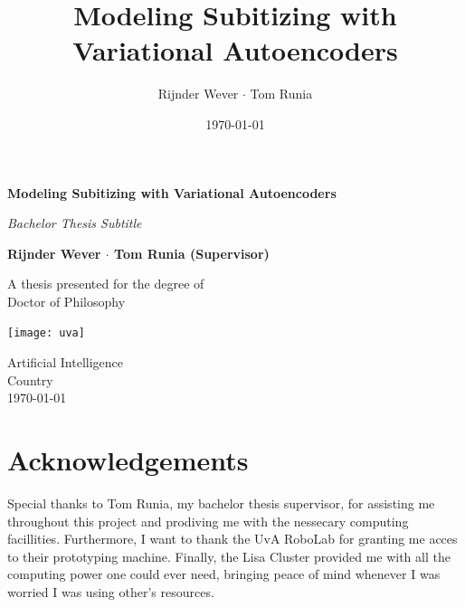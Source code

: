 \documentclass[twocolumn]{article}
\title{Modeling Subitizing with Variational Autoencoders}
\author{Rijnder Wever \(\cdot\) Tom Runia}
\affil{University of Amsterdam} %
\date{\today}
\begin{document}
\begin{titlepage}
    \begin{center}
        \vspace*{\fill} %
        \Huge
        \textbf{Modeling Subitizing with Variational Autoencoders}
        
        \vspace{0.5cm}
        \textit{Bachelor Thesis Subtitle}
        
        \vspace{1.5cm}
        \Large
        \textbf{Rijnder Wever \(\cdot\) Tom Runia (Supervisor)}\\
        
        \vfill
        
        A thesis presented for the degree of\\
        Doctor of Philosophy
        
        \vspace{0.8cm}
        
        \texttt{[image: uva]}
        
        Artificial Intelligence\\
        Country\\
        \today
        
    \end{center}
\end{titlepage}

\onecolumn %
{
  \hypersetup{linkcolor=black}
  \vspace*{\fill} %
  \tableofcontents
  \section*{Acknowledgements}

  Special thanks to Tom Runia, my bachelor thesis supervisor, for assisting me throughout this project and prodiving me with the nessecary computing facillities. Furthermore, I want to thank the UvA RoboLab for granting me acces to their prototyping machine. Finally, the Lisa Cluster provided me with all the computing power one could ever need, bringing peace of mind whenever I was worried I was using other's resources. 

  \vspace*{\fill}
}
\newpage
\twocolumn

\maketitle
\end{document}
